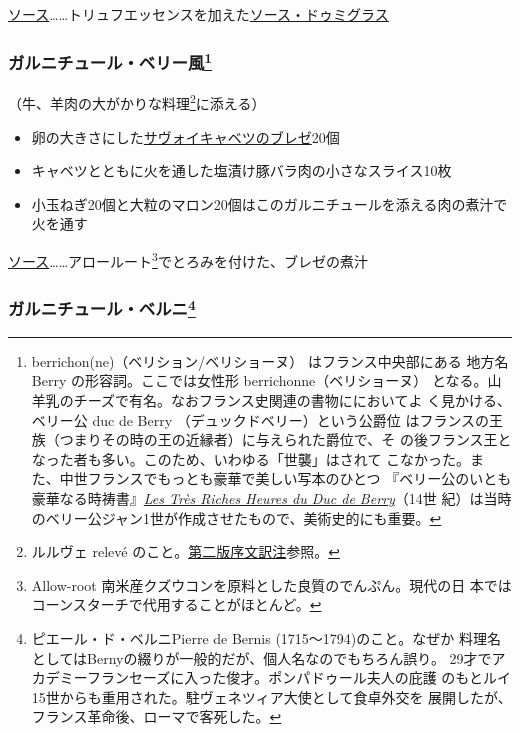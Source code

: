 \begin{recette}
\ul{ソース}\ldots{}\ldots{}トリュフエッセンスを加えた\protect\hyperlink{sauce-demi-glace}{ソース・ドゥミグラス}

\hypertarget{garniture-berrichonne}{%
\subsubsection[ガルニチュール・ベリー風]{\texorpdfstring{ガルニチュール・ベリー風\footnote{berrichon(ne)（ベリション/ベリショーヌ）
  はフランス中央部にある 地方名 Berry の形容詞。ここでは女性形
  berrichonne（ベリショーヌ）
  となる。山羊乳のチーズで有名。なおフランス史関連の書物ににおいてよ
  く見かける、ベリー公 duc de Berry （デュックドベリー）という公爵位
  はフランスの王族（つまりその時の王の近縁者）に与えられた爵位で、そ
  の後フランス王となった者も多い。このため、いわゆる「世襲」はされて
  こなかった。また、中世フランスでもっとも豪華で美しい写本のひとつ
  『ベリー公のいとも豪華なる時祷書』\href{http://gallica.bnf.fr/ark:/12148/btv1b520004510}{\emph{Les
  Très Riches Heures du Duc de Berry}}（14世
  紀）は当時のベリー公ジャン1世が作成させたもので、美術史的にも重要。}}{ガルニチュール・ベリー風}}\label{garniture-berrichonne}}



（牛、羊肉の大がかりな料理\footnote{ルルヴェ relevé
  のこと。\protect\hyperlink{releve}{第二版序文訳注}参照。}に添える）

\begin{itemize}
\item
  卵の大きさにした\protect\hyperlink{chou-braise}{サヴォイキャベツのブレゼ}20個
\item
  キャベツとともに火を通した塩漬け豚バラ肉の小さなスライス10枚
\item
  小玉ねぎ20個と大粒のマロン20個はこのガルニチュールを添える肉の煮汁で火を通す
\end{itemize}

\ul{ソース}\ldots{}\ldots{}アロールート\footnote{Allow-root
  南米産クズウコンを原料とした良質のでんぷん。現代の日
  本ではコーンスターチで代用することがほとんど。}でとろみを付けた、ブレゼの煮汁

\hypertarget{garniture-berny}{%
\subsubsection[ガルニチュール・ベルニ]{\texorpdfstring{ガルニチュール・ベルニ\footnote{ピエール・ド・ベルニPierre
  de Bernis (1715〜1794)のこと。なぜか
  料理名としてはBernyの綴りが一般的だが、個人名なのでもちろん誤り。
  29才でアカデミーフランセーズに入った俊才。ポンパドゥール夫人の庇護
  のもとルイ15世からも重用された。駐ヴェネツィア大使として食卓外交を
  展開したが、フランス革命後、ローマで客死した。}}{ガルニチュール・ベルニ}}\label{garniture-berny}}


\end{recette}
